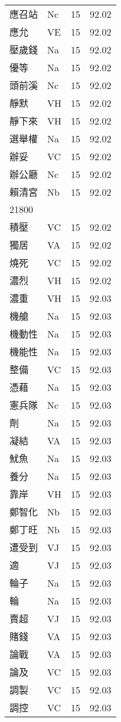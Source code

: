 \documentclass[twocolumn]{book}
\begin{document}
\begin{supertabular}{llrr}
應召站 & Nc & 15 &  92.02\\
應允 & VE & 15 &  92.02\\
壓歲錢 & Na & 15 &  92.02\\
優等 & Na & 15 &  92.02\\
頭前溪 & Nc & 15 &  92.02\\
靜默 & VH & 15 &  92.02\\
靜下來 & VH & 15 &  92.02\\
選舉權 & Na & 15 &  92.02\\
辦妥 & VC & 15 &  92.02\\
辦公廳 & Nc & 15 &  92.02\\
賴清宮 & Nb & 15 &  92.02\\
21800\\
積壓 & VC & 15 &  92.02\\
獨居 & VA & 15 &  92.02\\
燒死 & VC & 15 &  92.02\\
濃烈 & VH & 15 &  92.02\\
濃重 & VH & 15 &  92.03\\
機艙 & Na & 15 &  92.03\\
機動性 & Na & 15 &  92.03\\
機能性 & Na & 15 &  92.03\\
整備 & VC & 15 &  92.03\\
憑藉 & Na & 15 &  92.03\\
憲兵隊 & Nc & 15 &  92.03\\
劑 & Na & 15 &  92.03\\
凝結 & VA & 15 &  92.03\\
魷魚 & Na & 15 &  92.03\\
養分 & Na & 15 &  92.03\\
靠岸 & VH & 15 &  92.03\\
鄭智化 & Nb & 15 &  92.03\\
鄭丁旺 & Nb & 15 &  92.03\\
遭受到 & VJ & 15 &  92.03\\
適 & VJ & 15 &  92.03\\
輪子 & Na & 15 &  92.03\\
輪 & Na & 15 &  92.03\\
賣超 & VJ & 15 &  92.03\\
賭錢 & VA & 15 &  92.03\\
論戰 & VA & 15 &  92.03\\
論及 & VC & 15 &  92.03\\
調製 & VC & 15 &  92.03\\
調控 & VC & 15 &  92.03\\

\end{supertabular}
\end{document}
